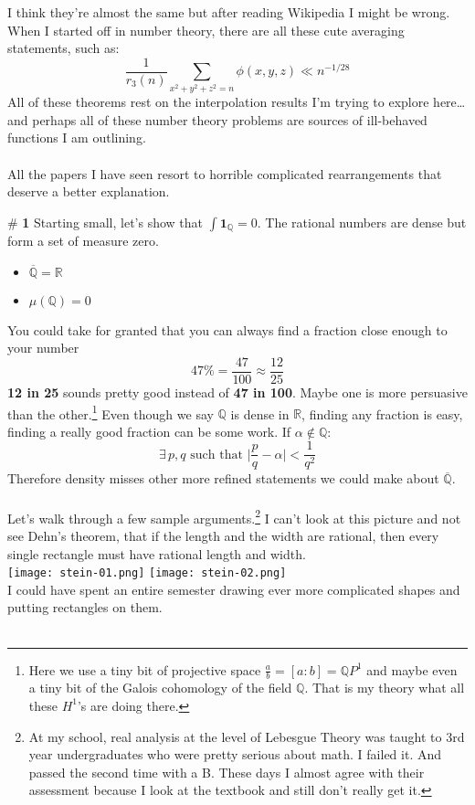 \documentclass[12pt]{article}
\begin{document}
I think they're almost the same but after reading Wikipedia I might be wrong.  When I started off in number theory, there are all these cute averaging statements, such as:
$$  \frac{1}{r_3(n)}\sum_{x^2 + y^2 + z^2 = n} \phi(x,y,z) \ll n^{-1/28} $$
All of these theorems rest on the interpolation results I'm trying to explore here\dots and perhaps all of these number theory problems are sources of ill-behaved functions I am outlining.  \\ \\
All the papers I have seen resort to horrible complicated rearrangements that deserve a better explanation.  

\newpage

\noindent \# \textbf{1} Starting small, let's show that $ \int \mathbf{1}_\mathbb{Q} = 0 $.  The rational numbers are dense but form a set of measure zero.
\begin{itemize}
\item $\overline{\mathbb{Q}}= \mathbb{R}$
\item $\mu(\mathbb{Q}) = 0$
\end{itemize}
You could take for granted that you can always find a fraction close enough to your number 
$$ 47\% = \frac{47}{100} \approx \frac{12}{25} $$
\textbf{12 in 25} sounds pretty good instead of \textbf{47 in 100}.  Maybe one is more persuasive than the other.\footnote{Here we use a tiny bit of projective space $\frac{a}{b} = [a:b] = \mathbb{Q}P^1$ and maybe even a tiny bit of the Galois cohomology of the field $\mathbb{Q}$.  That is my theory what all these $H^1$'s are doing there. }  Even though we say $\mathbb{Q}$ is dense in $\mathbb{R}$, finding any fraction is easy, finding a really good fraction can be some work.  If $\alpha \notin \mathbb{Q}$: 
$$ \exists \, p,q \text{ such that }  \bigg| \frac{p}{q} - \alpha \bigg| < \frac{1}{q^2} $$
Therefore density misses other more refined statements we could make about $\overline{\mathbb{Q}}$. \\ \\
Let's walk through a few sample arguments.\footnote{At my school, real analysis at the level of Lebesgue Theory was taught to 3rd year undergraduates who were pretty serious about math. I failed it.  And passed the second time with a B.  These days I almost agree with their assessment because I look at the textbook and still don't really get it.}  I can't look at this picture and not see Dehn's theorem, that if the length and the width are rational, then every single rectangle must have rational length and width.\\ 
\texttt{[image: stein-01.png]}
\texttt{[image: stein-02.png]} \\ 
I could have spent an entire semester drawing ever more complicated shapes and putting rectangles on them. \\
 \\
\end{document}
